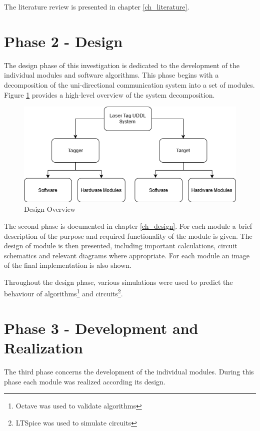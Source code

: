 The literature review is presented in chapter \ref{ch_literature}.


\section{Phase 2 - Design}

The design phase of this investigation is dedicated to the development of the individual modules and software algorithms. This phase begins with a decomposition of the uni-directional communication system into a set of modules. Figure \ref{fig:designoverview} provides a high-level overview of the system decomposition.

\begin{figure}[H]
	\centering
	\includegraphics[width=0.7\linewidth]{figures/methodology/design_overview}
	\caption{Design Overview}
	\label{fig:designoverview}
\end{figure}

The second phase is documented in chapter \ref{ch_design}. For each module a brief description of the purpose and required functionality of the module is given. The design of module is then presented, including important calculations, circuit schematics and relevant diagrams where appropriate. For each module an image of the final implementation is also shown.

Throughout the design phase, various simulations were used to predict the behaviour of algorithms\footnote{Octave was used to validate algorithms} and circuits\footnote{LTSpice was used to simulate circuits}.


\section{Phase 3 - Development and Realization}

The third phase concerns the development of the individual modules. During this phase each module was realized according its design.

